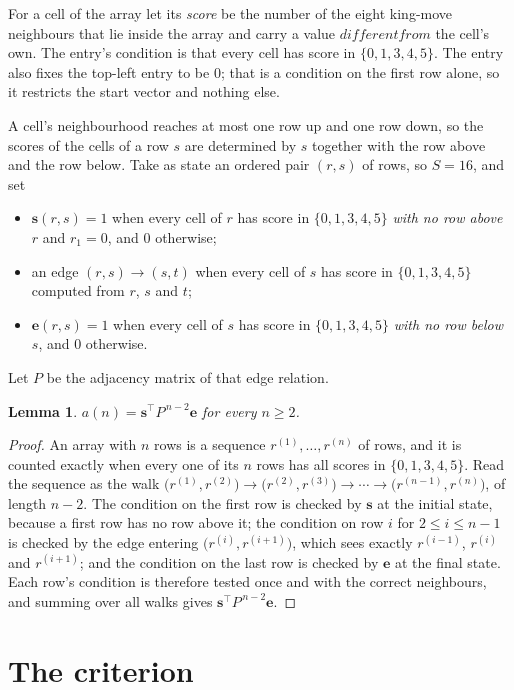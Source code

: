 \documentclass[11pt,a4paper]{article}
\theoremstyle{plain}
\newtheorem{lemma}[theorem]{Lemma}
\theoremstyle{definition}
\begin{document}
For a cell of the array let its \emph{score} be the number of the eight king-move neighbours that lie inside
the array and carry a value $different from$ the cell's own. The entry's condition is that every cell
has score in $\{0,1,3,4,5\}$. The entry also fixes the top-left entry to be $0$; that is a condition on the first row alone, so it restricts the start vector and nothing else.

A cell's neighbourhood reaches at most one row up and one row down, so the scores of the
cells of a row $s$ are determined by $s$ together with the row above and the row below.
Take as state an ordered pair $(r,s)$ of rows, so $S=16$, and set
\begin{itemize}
\item $\mathbf{s}(r,s)=1$ when every cell of $r$ has score in $\{0,1,3,4,5\}$ \emph{with no row
above $r$} and $r_1=0$, and $0$ otherwise;
\item an edge $(r,s)\to(s,t)$ when every cell of $s$ has score in $\{0,1,3,4,5\}$ computed from
$r$, $s$ and $t$;
\item $\mathbf{e}(r,s)=1$ when every cell of $s$ has score in $\{0,1,3,4,5\}$ \emph{with no row
below $s$}, and $0$ otherwise.
\end{itemize}
Let $P$ be the adjacency matrix of that edge relation.

\begin{lemma}\label{lem:walk}
$a(n)=\mathbf{s}^{\!\top}P^{\,n-2}\mathbf{e}$ for every $n\ge2$.
\end{lemma}

\begin{proof}
An array with $n$ rows is a sequence $r^{(1)},\dots,r^{(n)}$ of rows, and it is counted
exactly when every one of its $n$ rows has all scores in $\{0,1,3,4,5\}$. Read the sequence as the
walk $\bigl(r^{(1)},r^{(2)}\bigr)\to\bigl(r^{(2)},r^{(3)}\bigr)\to\cdots\to
\bigl(r^{(n-1)},r^{(n)}\bigr)$, of length $n-2$. The condition on the first row is
checked by $\mathbf{s}$ at the initial state, because a first row has no row above it; the
condition on row $i$ for $2\le i\le n-1$ is checked by the edge entering
$\bigl(r^{(i)},r^{(i+1)}\bigr)$, which sees exactly $r^{(i-1)}$, $r^{(i)}$ and
$r^{(i+1)}$; and the condition on the last row is checked by $\mathbf{e}$ at the final
state. Each row's condition is therefore tested once and with the correct neighbours, and
summing over all walks gives $\mathbf{s}^{\!\top}P^{\,n-2}\mathbf{e}$.
\end{proof}

\section{The criterion}
\end{document}
